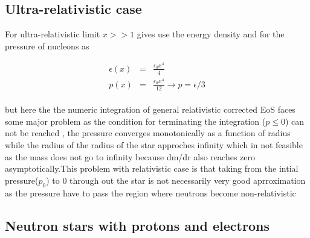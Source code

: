 \documentclass{report}
\begin{document}
\subsection{Ultra-relativistic case}
For ultra-relativistic limit $x>>1$ gives use the energy density and for the pressure of nucleons as 
\begin{center}
\begin{eqnarray}
\epsilon(x) &=& \frac{\epsilon_0 x^4}{4}\\
\label{3.11}
p(x) &=& \frac{\epsilon_0 x^4}{12} \rightarrow p = \epsilon/3
\label{3.12}
\end{eqnarray}
\end{center}
\paragraph{ }
but here the the numeric integration of general relativistic corrected EoS faces some major problem as the condition for terminating the integration ($p\leq0$) can not be reached  , the pressure converges monotonically as a function of radius while the radius of the radius of the star approches infinity which in not feasible as the mass does not go to infinity because dm/dr also reaches zero asymptotically.This problem with relativistic case is that taking from the intial pressure($p_0$) to 0 through out the star is not necessarily very good aprroximation as the pressure have to pass the region where neutrons become non-relativistic
\subsection{Neutron stars with protons and electrons}
\end{document}
